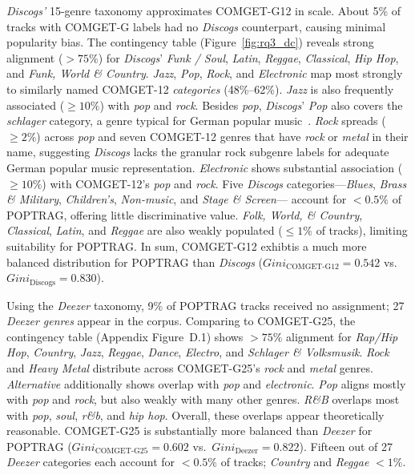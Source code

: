 \documentclass{article}
\begin{document}
\textit{Discogs'} 15-genre taxonomy approximates COMGET-G12 in scale.  About 5\% of tracks with COMGET-G labels had no \textit{Discogs} counterpart, causing minimal popularity bias.
The contingency table (Figure~\ref{fig:rq3_dc}) reveals strong alignment ($>75\%$) for \textit{Discogs}' \textit{Funk / Soul}, \textit{Latin}, \textit{Reggae}, \textit{Classical}, \textit{Hip Hop}, and \textit{Funk, World \& Country}. \textit{Jazz}, \textit{Pop}, \textit{Rock}, and \textit{Electronic} map most strongly to similarly named COMGET-12 \textit{categories} (48\%--62\%). \textit{Jazz} is also frequently associated ($\geq 10\%$) with \textit{pop} and \textit{rock}. Besides \textit{pop}, \textit{Discogs}' \textit{Pop} also covers the \textit{schlager} category, a genre typical for German popular music~\citep{thiesenTakingStockDiscourse2023}. \textit{Rock} spreads ($\geq 2\%$) across \textit{pop} and seven COMGET-12 genres that have \textit{rock} or \textit{metal} in their name, suggesting \textit{Discogs} lacks the granular rock subgenre labels for adequate German popular music representation. \textit{Electronic} shows substantial association ($\geq 10\%$) with COMGET-12's \textit{pop} and \textit{rock}. Five \textit{Discogs} categories—\textit{Blues}, \textit{Brass \& Military}, \textit{Children's}, \textit{Non-music}, and \textit{Stage \& Screen}— account for $<0.5\%$ of POPTRAG, offering little discriminative value. \textit{Folk, World, \& Country}, \textit{Classical}, \textit{Latin}, and \textit{Reggae} are also weakly populated ($\leq1\%$ of tracks), limiting suitability for POPTRAG. In sum, COMGET-G12 exhibtis a much more balanced distribution for POPTRAG than \textit{Discogs} ($\textit{Gini}_{\text{COMGET-G12}}=0.542$ vs.\ $\textit{Gini}_{\text{Discogs}}=0.830$).

Using the \textit{Deezer} taxonomy, 9\% of POPTRAG tracks received no assignment; 27 \textit{Deezer genres} appear in the corpus. Comparing to COMGET-G25, the contingency table (Appendix Figure~D.1) shows $>75\%$ alignment for \textit{Rap/Hip Hop}, \textit{Country}, \textit{Jazz}, \textit{Reggae}, \textit{Dance}, \textit{Electro}, and \textit{Schlager \& Volksmusik}. \textit{Rock} and \textit{Heavy Metal} distribute across COMGET-G25's \textit{rock} and \textit{metal} genres. \textit{Alternative} additionally shows overlap with \textit{pop} and \textit{electronic}. \textit{Pop} aligns mostly with \textit{pop} and \textit{rock}, but also weakly with many other genres. \textit{R\&B} overlaps most with \textit{pop}, \textit{soul}, \textit{r\&b}, and \textit{hip hop}. Overall, these overlaps appear theoretically reasonable. COMGET-G25 is substantially more balanced than \textit{Deezer} for POPTRAG ($\textit{Gini}_{\text{COMGET-G25}}=0.602$ vs.\ $\textit{Gini}_{\text{Deezer}}=0.822$). Fifteen out of 27 \textit{Deezer} categories each account for $<0.5\%$ of tracks; \textit{Country} and \textit{Reggae} $<1\%$.
\end{document}
